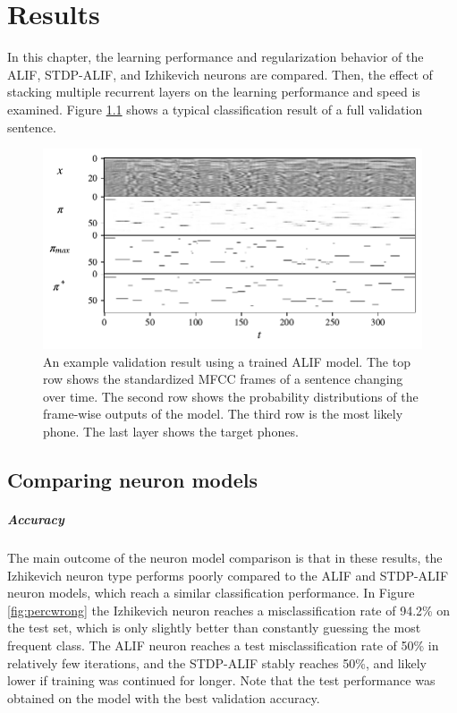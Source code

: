 \chapter{Results}\label{ch:results}
In this chapter, the learning performance and regularization behavior of the ALIF, STDP-ALIF, and Izhikevich neurons are compared.
Then, the effect of stacking multiple recurrent layers on the learning performance and speed is examined.
Figure \ref{fig:inoutpair} shows a typical classification result of a full validation sentence.

	\begin{figure}[ht]
	    \myfloatalign
	    \includegraphics[width=\linewidth]{gfx/InOutPair}
	    \caption[Input-output-target example.]{An example validation result using a trained ALIF model. The top row shows the standardized MFCC frames of a sentence changing over time. The second row shows the probability distributions of the frame-wise outputs of the model. The third row is the most likely phone. The last layer shows the target phones.}
	    \label{fig:inoutpair}
	  \end{figure}

\section{Comparing neuron models}
	\paragraph{Accuracy}
		The main outcome of the neuron model comparison is that in these results, the Izhikevich neuron type performs poorly compared to the ALIF and STDP-ALIF neuron models, which reach a similar classification performance.
		In Figure \ref{fig:percwrong} the Izhikevich neuron reaches a misclassification rate of 94.2\% on the test set, which is only slightly better than constantly guessing the most frequent class.
		The ALIF neuron reaches a test misclassification rate of 50\% in relatively few iterations, and the STDP-ALIF stably reaches 50\%, and likely lower if training was continued for longer.
		Note that the test performance was obtained on the model with the best validation accuracy.

